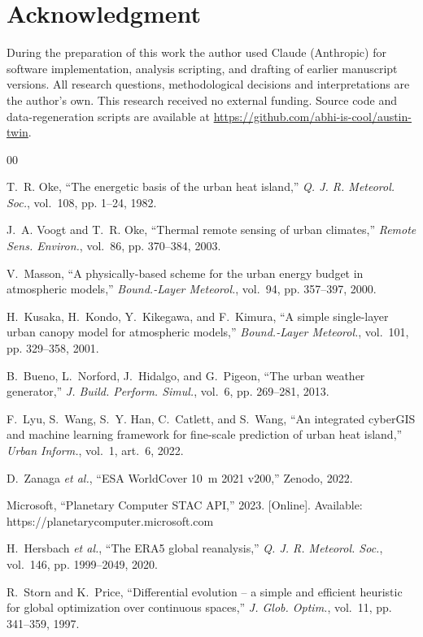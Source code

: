 \section*{Acknowledgment}
During the preparation of this work the author used Claude (Anthropic)
for software implementation, analysis scripting, and drafting of earlier
manuscript versions. All research questions, methodological decisions and
interpretations are the author's own. This research received no external
funding. Source code and data-regeneration scripts are available at
\url{https://github.com/abhi-is-cool/austin-twin}.

\begin{thebibliography}{00}

T.~R. Oke, ``The energetic basis of the urban heat island,'' \emph{Q. J.
R. Meteorol. Soc.}, vol.~108, pp. 1--24, 1982.

J.~A. Voogt and T.~R. Oke, ``Thermal remote sensing of urban climates,''
\emph{Remote Sens. Environ.}, vol.~86, pp. 370--384, 2003.

V.~Masson, ``A physically-based scheme for the urban energy budget in
atmospheric models,'' \emph{Bound.-Layer Meteorol.}, vol.~94, pp.
357--397, 2000.

H.~Kusaka, H.~Kondo, Y.~Kikegawa, and F.~Kimura, ``A simple single-layer
urban canopy model for atmospheric models,'' \emph{Bound.-Layer
Meteorol.}, vol.~101, pp. 329--358, 2001.

B.~Bueno, L.~Norford, J.~Hidalgo, and G.~Pigeon, ``The urban weather
generator,'' \emph{J. Build. Perform. Simul.}, vol.~6, pp. 269--281,
2013.

F.~Lyu, S.~Wang, S.~Y. Han, C.~Catlett, and S.~Wang, ``An integrated
cyberGIS and machine learning framework for fine-scale prediction of
urban heat island,'' \emph{Urban Inform.}, vol.~1, art.~6, 2022.

D.~Zanaga \emph{et al.}, ``ESA WorldCover 10~m 2021 v200,'' Zenodo, 2022.

Microsoft, ``Planetary Computer STAC API,'' 2023. [Online]. Available:
https://planetarycomputer.microsoft.com

H.~Hersbach \emph{et al.}, ``The ERA5 global reanalysis,'' \emph{Q. J. R.
Meteorol. Soc.}, vol.~146, pp. 1999--2049, 2020.

R.~Storn and K.~Price, ``Differential evolution -- a simple and
efficient heuristic for global optimization over continuous spaces,''
\emph{J. Glob. Optim.}, vol.~11, pp. 341--359, 1997.


\end{thebibliography}
